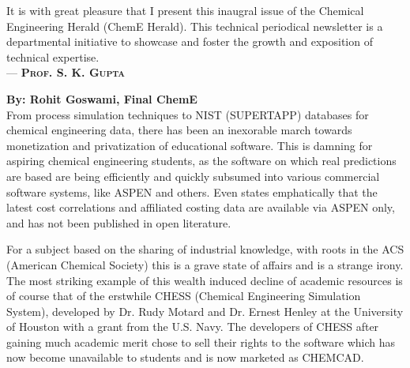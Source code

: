\documentclass[11pt]{article} %
\begin{document}
\begin{minipage}[t]{.66\linewidth}

\begin{mdframed}[style=intextbox,frametitle={}] %

  \hypertarget{hodOffice}{} %
  It is with great pleasure that I present this inaugral issue of the Chemical
  Engineering Herald (ChemE Herald). This technical periodical newsletter is a
  departmental initiative to showcase and foster the growth and exposition of
  technical expertise. \\
  --- \textsc{\textbf{Prof. S. K. Gupta}}
\end{mdframed}

  \hypertarget{moneyHungry}{}  %
  { \small  \textbf{By: Rohit Goswami, Final ChemE}\\ }
  From process simulation techniques to NIST (SUPERTAPP) databases for chemical engineering
  data, there has been an inexorable march towards monetization and
  privatization of educational software. This is damning for aspiring chemical
  engineering students, as the software on which real predictions are based are
  being efficiently and quickly subsumed into various commercial software
  systems, like ASPEN and others. Even
  \autocite{towlerChemicalEngineeringDesign2013} states emphatically that the
  latest cost correlations and affiliated costing data are available via ASPEN
  only, and has not been published in open literature.

  For a subject based on the sharing of industrial knowledge, with roots in the
  ACS (American Chemical Society) this is a grave state of affairs and is a
  strange irony. The most striking example of this wealth induced decline of academic
  resources is of course that of the erstwhile CHESS (Chemical Engineering
  Simulation System), developed by Dr. Rudy Motard and Dr. Ernest Henley at the
  University of Houston with a grant from the U.S. Navy. The developers of CHESS
  after gaining much academic merit chose to sell their rights to the software
  which has now become unavailable to students and is now marketed as CHEMCAD.


\end{minipage}
\end{document}
